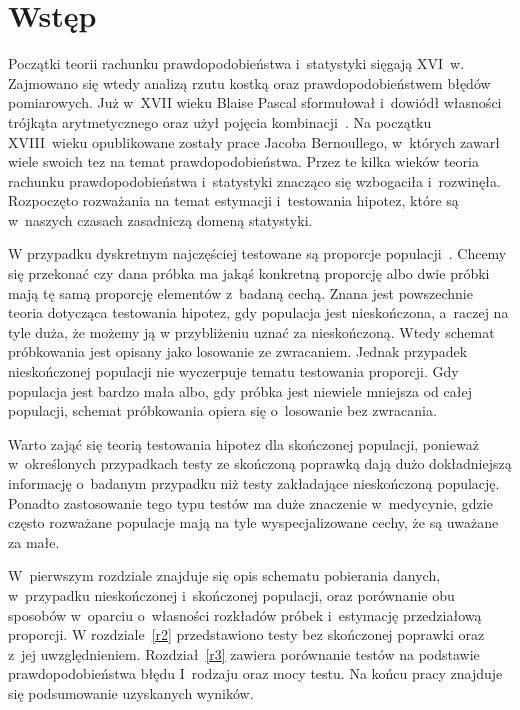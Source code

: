 \chapter*{Wstęp}
Początki teorii rachunku prawdopodobieństwa i~statystyki sięgają XVI~w. Zajmowano się wtedy analizą rzutu kostką oraz prawdopodobieństwem błędów pomiarowych. Już w~XVII wieku Blaise Pascal sformułował i~dowiódł własności trójkąta arytmetycznego oraz użył pojęcia kombinacji~\cite{Hald2003}. Na początku XVIII~wieku opublikowane zostały prace Jacoba Bernoullego, w~których zawarł wiele swoich tez na temat prawdopodobieństwa. Przez te kilka wieków teoria rachunku prawdopodobieństwa i~statystyki znacząco się wzbogaciła i~rozwinęła. Rozpoczęto rozważania na temat estymacji i~testowania hipotez, które są w~naszych czasach zasadniczą domeną statystyki.

W przypadku dyskretnym najczęściej testowane są proporcje populacji~\cite{Lehmann1968}. Chcemy się przekonać czy dana próbka ma jakąś konkretną proporcję albo dwie próbki mają tę samą proporcję elementów z~badaną cechą. Znana jest powszechnie teoria dotycząca testowania hipotez, gdy populacja jest nieskończona, a~raczej na tyle duża, że możemy ją w przybliżeniu uznać za nieskończoną. Wtedy schemat próbkowania jest opisany jako losowanie ze zwracaniem. Jednak przypadek nieskończonej populacji nie wyczerpuje tematu testowania proporcji. Gdy populacja jest bardzo mała albo, gdy próbka jest niewiele mniejsza od całej populacji, schemat próbkowania opiera się o~losowanie bez zwracania. 

Warto zająć się teorią testowania hipotez dla skończonej populacji, ponieważ w~określonych przypadkach testy ze skończoną poprawką dają dużo dokładniejszą informację o~badanym przypadku niż testy zakładające nieskończoną populację. Ponadto zastosowanie tego typu testów ma duże znaczenie w~medycynie, gdzie często rozważane populacje mają na tyle wyspecjalizowane cechy, że są uważane za małe.

W~pierwszym rozdziale znajduje się opis schematu pobierania danych, w~przypadku nieskończonej i~skończonej populacji, oraz porównanie obu sposobów w~oparciu o~własności rozkładów próbek i~estymację przedziałową proporcji. W rozdziale~\ref{r2} przedstawiono testy bez skończonej poprawki oraz z~jej uwzględnieniem. Rozdział~\ref{r3} zawiera porównanie testów na podstawie prawdopodobieństwa błędu I~rodzaju oraz mocy testu. Na końcu pracy znajduje się podsumowanie uzyskanych wyników.